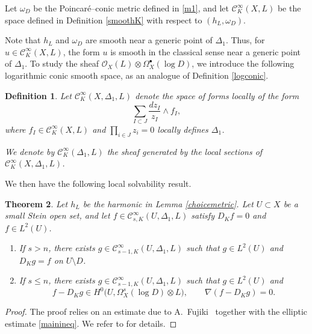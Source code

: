 \documentclass[english]{amsart}
\newcommand{\cC}{\mathcal{C}}
\renewcommand{\leq}{\leqslant}
\newtheorem{thm}{Theorem}[section]
\newtheorem{defn}[thm]{Definition}
\numberwithin{equation}{thm}
\begin{document}
\medskip

Let $\omega_D$ be the Poincaré–conic metric defined in \eqref{m1}, and let
$\cC^\infty_K(X,L)$ be the space defined in Definition \ref{smoothK} with respect to $(h_L,\omega_D)$.

\medskip

Note that $h_L$ and $\omega_D$ are smooth near a generic point of $\Delta_1$.
Thus, for $u \in \cC^\infty_K(X,L)$, the form $u$ is smooth in the classical sense near a generic point of $\Delta_1$.
To study the sheaf $\mathcal O_X(L) \otimes \Omega_X^\bullet(\log D)$, we introduce the following logarithmic conic smooth space, as an analogue of Definition \ref{logconic}.

\begin{defn}\label{logKsmooth}
	Let $\cC^\infty_K(X,\Delta_1,L)$ denote the space of forms locally of the form
	\[
	\sum_{I \subset J} \frac{dz_I}{z_I} \wedge f_I,
	\]
	where $f_I \in \cC^\infty_K(X,L)$ and $\prod_{i \in J} z_i = 0$ locally defines $\Delta_1$.
	
	We denote by $\cC^\infty_K(\Delta_1,L)$ the sheaf generated by the local sections of
	$\cC^\infty_K(X,\Delta_1,L)$.
\end{defn}

We then have the following local solvability result.

\begin{thm}\label{localsolution}\cite[Cor 9.9]{CDHP}
	Let $h_L$ be the harmonic in Lemma \ref{choicemetric}.
	Let $U \subset X$ be a small Stein open set, and let
	$f \in \cC^\infty_{s,K}(U,\Delta_1,L)$ satisfy $D_K f = 0$ and $f \in L^2(U)$.
	\begin{enumerate}
		\item If $s > n$, there exists $g \in \cC^\infty_{s-1,K}(U,\Delta_1,L)$ such that
		$g \in  L^2(U)$ and $D_K g = f$ on $U \setminus D$.
		
		\item If $s \leq n$, there exists $g \in \cC^\infty_{s-1,K}(U,\Delta_1,L)$ such that
		$g \in L^2(U)$ and
		\[
		f - D_K g \in H^0\bigl(U, \Omega_X^s(\log D) \otimes L\bigr),
		\qquad
		\nabla(f - D_K g) = 0.
		\]
	\end{enumerate}
\end{thm}

\begin{proof}
	The proof relies on an estimate due to A.~Fujiki~\cite{Fuj92} together with the elliptic estimate \eqref{mainineq}.
	We refer to \cite[Cor 9.9]{CDHP} for details.
\end{proof}
\end{document}
